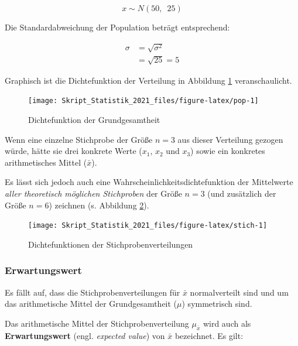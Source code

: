 \documentclass[
  11pt,
  ngerman,
  a4paper,
]{report}
\begin{document}
\[ x \sim N(50, \enspace 25) \]

Die Standardabweichung der Population beträgt entsprechend:

\nopagebreak

\[\begin{aligned}
\sigma&=\sqrt{\sigma^2}\\[4pt]
&=\sqrt{25}=5\end{aligned}\]

Graphisch ist die Dichtefunktion der Verteilung in Abbildung \ref{fig:pop} veranschaulicht.

\begin{figure}[!h]

{\centering \texttt{[image: Skript\_Statistik\_2021\_files/figure-latex/pop-1]} 

}

\caption{Dichtefunktion der Grundgesamtheit}\label{fig:pop}
\end{figure}

Wenn eine einzelne Stichprobe der Größe \(n=3\) aus dieser Verteilung gezogen würde, hätte sie drei konkrete Werte (\(x_1\), \(x_2\) und \(x_3\)) sowie ein konkretes arithmetisches Mittel (\(\bar{x}\)).

Es lässt sich jedoch auch eine Wahrscheinlichkeitsdichtefunktion der Mittelwerte \emph{aller theoretisch möglichen Stichproben} der Größe \(n=3\) (und zusätzlich der Größe \(n=6\)) zeichnen (s. Abbildung \ref{fig:stich}).

\begin{figure}[!h]

{\centering \texttt{[image: Skript\_Statistik\_2021\_files/figure-latex/stich-1]} 

}

\caption{Dichtefunktionen der Stichprobenverteilungen}\label{fig:stich}
\end{figure}

\hypertarget{erwartungswert}{%
\subsubsection{Erwartungswert}\label{erwartungswert}}

Es fällt auf, dass die Stichprobenverteilungen für \(\bar{x}\) normalverteilt sind und um das arithmetische Mittel der Grundgesamtheit (\(\mu\)) symmetrisch sind.

Das arithmetische Mittel der Stichprobenverteilung \(\mu_{\bar{x}}\) wird auch als \textbf{Erwartungswert} (engl. \emph{expected value}) von \(\bar{x}\) bezeichnet. Es gilt:
\end{document}

